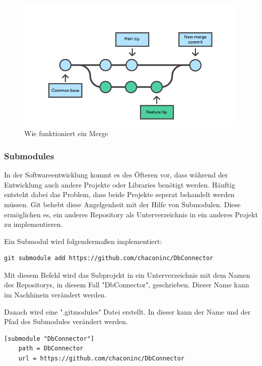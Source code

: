 \begin{figure}[h!]
    \centering
    \includegraphics[width=0.6\linewidth]{pics/merge.png}
    \caption{Wie funktioniert ein Merge}
    \label{fig:enter-label}
\end{figure}


\subsubsection{Submodules}

In der Softwareentwicklung kommt es des Öfteren vor, dass während der Entwicklung auch andere Projekte oder Libraries benötigt werden. Häuftig entsteht dabei das Problem, dass beide Projekte seperat behandelt werden müssen. Git behebt diese Angelgenheit mit der Hilfe von Submodulen. Diese ermöglichen es, ein anderes Repository als Unterverzeichnis in ein anderes Projekt zu implementieren.

Ein Submodul wird folgendermaßen implementiert:

\begin{lstlisting}
git submodule add https://github.com/chaconinc/DbConnector
\end{lstlisting}

Mit diesem Befehl wird das Subprojekt in ein Unterverzeichnis mit dem Namen des Repositorys, in diesem Fall "DbConnector", geschrieben. Dieser Name kann im Nachhinein verändert werden.

Danach wird eine ".gitmodules" Datei erstellt. In dieser kann der Name und der Pfad des Submodules verändert werden.
\begin{lstlisting}
[submodule "DbConnector"]
	path = DbConnector
	url = https://github.com/chaconinc/DbConnector
\end{lstlisting}

